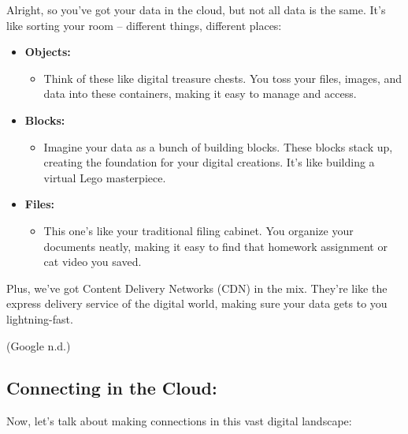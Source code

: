 \documentclass[
  letterpaper,
  DIV=11,
  numbers=noendperiod]{scrreprt}
\providecommand{\tightlist}{%
  \setlength{\itemsep}{0pt}\setlength{\parskip}{0pt}}\usepackage{longtable,booktabs,array}
\begin{document}
Alright, so you've got your data in the cloud, but not all data is the
same. It's like sorting your room -- different things, different places:

\begin{itemize}
\item
  \textbf{Objects:}

  \begin{itemize}
  \tightlist
  \item
    Think of these like digital treasure chests. You toss your files,
    images, and data into these containers, making it easy to manage and
    access.
  \end{itemize}
\item
  \textbf{Blocks:}

  \begin{itemize}
  \tightlist
  \item
    Imagine your data as a bunch of building blocks. These blocks stack
    up, creating the foundation for your digital creations. It's like
    building a virtual Lego masterpiece.
  \end{itemize}
\item
  \textbf{Files:}

  \begin{itemize}
  \tightlist
  \item
    This one's like your traditional filing cabinet. You organize your
    documents neatly, making it easy to find that homework assignment or
    cat video you saved.
  \end{itemize}
\end{itemize}

Plus, we've got Content Delivery Networks (CDN) in the mix. They're like
the express delivery service of the digital world, making sure your data
gets to you lightning-fast.

(Google n.d.)

\subsection{Connecting in the Cloud:}\label{connecting-in-the-cloud}

Now, let's talk about making connections in this vast digital landscape:
\end{document}
